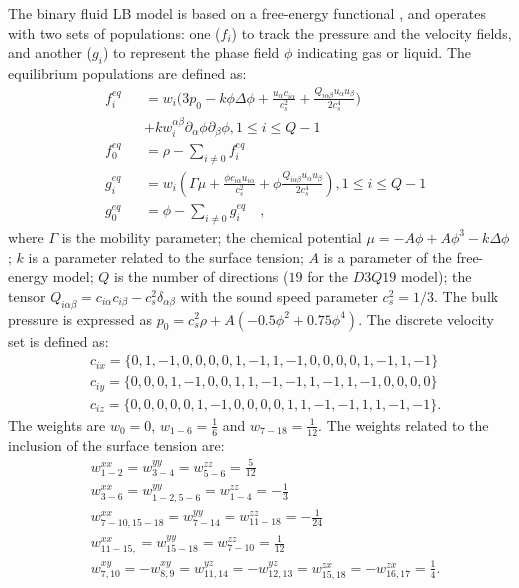 \documentclass{article}
\begin{document}
The binary fluid LB model is
based on a free-energy functional \cite{swift,landau}, and operates with two
sets of populations: one ($f_i$) to track the pressure and the velocity fields, and another ($g_i$) to represent the
phase field $\phi$ indicating gas or liquid.
The equilibrium populations \cite{pooley-contact} are defined as:
\begin{equation}
\label{set:equilibrium:binary}
\begin{aligned}
&f_i^{eq}&&=w_i 
\biggl(3
p_0 - k \phi \Delta \phi
+\frac{u_{\alpha}c_{i\alpha}}{c_s^2}+\frac{Q_{i\alpha\beta}u_{\alpha } u_ {
\beta}}{2 c_s^4}\biggr)\\
&&&+k w_i^{\alpha\beta} \partial_{\alpha} \phi\partial_{\beta} \phi, 1\leq i \leq Q-1\\
&f_0^{eq}&&=\rho-\sum_{i\neq0}{f_i^{eq}}\\
&g_i^{eq}&&=w_i\left(\Gamma \mu + \frac{\phi c_{i\alpha} u_{i\alpha}}{c_s^2}+\phi
\frac{Q_{i\alpha\beta}u_{\alpha}u_{\beta}}{2 c_s^4}\right), 1 \leq i \leq Q-1\\
&g_0^{eq}&&=\phi-\sum_{i\neq0}{g_i^{eq}}\quad,
\end{aligned}
\end{equation}
where $\Gamma$ is the mobility parameter; the chemical potential
$\mu=-A\phi+A\phi^3-k\Delta\phi$; $k$ is a parameter related to the surface
tension; $A$ is a parameter of the free-energy model; $Q$ is the number of directions ($19$
for the $D3Q19$ model); the tensor
$Q_{i\alpha\beta}=c_{i\alpha} c_{i\beta} - c_s^2 \delta_{\alpha\beta}$ with
the sound speed parameter $c_s^2=1/3$. The bulk pressure
is expressed as $p_0=c_s^2 \rho +A (-0.5 \phi^2+0.75 \phi^4)$. The discrete velocity set is defined as:
\begin{equation} 
\begin{aligned}
&c_{ix}=\{0,1,-1,0, 0,0, 0,1,-1, 1,-1,0, 0, 0, 0,1,-1, 1,-1\}\\
&c_{iy}=\{0,0, 0,1,-1,0, 0,1, 1,-1,-1,1,-1, 1,-1,0, 0, 0, 0\}\\
&c_{iz}=\{0,0, 0,0, 0,1,-1,0, 0, 0, 0,1, 1,-1,-1,1, 1,-1,-1\}.
\end{aligned}
\end{equation}
The weights are $w_0=0$, $w_{1-6}=\frac{1}{6}$ and $w_{7-18}=\frac{1}{12}$. The weights
related to the inclusion of the surface tension are:
\begin{equation}
\begin{aligned}
&w^{xx}_{1-2}=w^{yy}_{3-4}=w^{zz}_{5-6}=\frac{5}{12}\\
&w^{xx}_{3-6}=w^{yy}_{1-2,5-6}=w^{zz}_{1-4}=-\frac{1}{3}\\
&w^{xx}_{7-10,15-18}=w^{yy}_{7-14}=w^{zz}_{11-18}=-\frac{1}{24}\\
&w^{xx}_{11-15,}=w^{yy}_{15-18}=w^{zz}_{7-10}=\frac{1}{12}\\
&w^{xy}_{7,10}=-w^{xy}_{8,9}=w^{yz}_{11,14}=-w^{yz}_{12,13}=w^{zx}_{15,18}=-w^{zx}_{16,17}=\frac{1}{
4}.
\end{aligned}
\end{equation}
\end{document}
